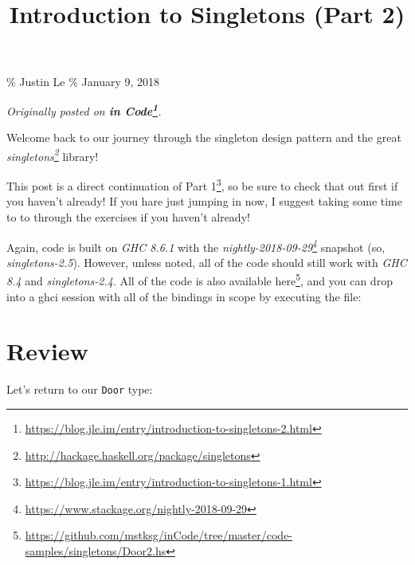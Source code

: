 \documentclass[]{article}
\title{Introduction to Singletons (Part 2)}
\newenvironment{Shaded}{}{}
\newcommand{\CommentTok}[1]{\textcolor[rgb]{0.38,0.63,0.69}{\textit{#1}}}
\newcommand{\DataTypeTok}[1]{\textcolor[rgb]{0.56,0.13,0.00}{#1}}
\newcommand{\ExtensionTok}[1]{#1}
\newcommand{\KeywordTok}[1]{\textcolor[rgb]{0.00,0.44,0.13}{\textbf{#1}}}
\newcommand{\NormalTok}[1]{#1}
\newcommand{\OperatorTok}[1]{\textcolor[rgb]{0.40,0.40,0.40}{#1}}
\newcommand{\OtherTok}[1]{\textcolor[rgb]{0.00,0.44,0.13}{#1}}
\renewcommand{\href}[2]{#2\footnote{\url{#1}}}
\begin{document}
\maketitle

\% Justin Le \% January 9, 2018

\emph{Originally posted on
\textbf{\href{https://blog.jle.im/entry/introduction-to-singletons-2.html}{in
Code}}.}

Welcome back to our journey through the singleton design pattern and the great
\emph{\href{http://hackage.haskell.org/package/singletons}{singletons}} library!

This post is a direct continuation of
\href{https://blog.jle.im/entry/introduction-to-singletons-1.html}{Part 1}, so
be sure to check that out first if you haven't already! If you hare just jumping
in now, I suggest taking some time to to through the exercises if you haven't
already!

Again, code is built on \emph{GHC 8.6.1} with the
\emph{\href{https://www.stackage.org/nightly-2018-09-29}{nightly-2018-09-29}}
snapshot (so, \emph{singletons-2.5}). However, unless noted, all of the code
should still work with \emph{GHC 8.4} and \emph{singletons-2.4}. All of the code
is also available
\href{https://github.com/mstksg/inCode/tree/master/code-samples/singletons/Door2.hs}{here},
and you can drop into a ghci session with all of the bindings in scope by
executing the file:

\begin{Shaded}
\end{Shaded}

\section{Review}\label{review}

Let's return to our \texttt{Door} type:

\begin{Shaded}
\end{Shaded}
\end{document}
